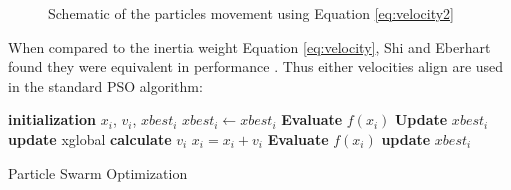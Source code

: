 \begin{figure}
    \centering
    
    \caption{Schematic of the particles movement using Equation \ref{eq:velocity2}}
    \label{fig:particle movement}
\end{figure}

When compared to the inertia weight Equation \ref{eq:velocity}, Shi and Eberhart found they were equivalent in performance \cite{}. 
Thus either velocities align are used in the standard PSO algorithm: 
\begin{algorithm}[H]
  \begin{algorithmic}[1]

        \State \textbf{initialization} $x_i$, $v_i$, $xbest_i$ 
        $xbest_i \gets xbest_i$
        \State \textbf{Evaluate} $f(x_i)$  
        \State \textbf{Update} $xbest_i$ 
    \EndFor
            \State \textbf{update} xglobal 
            \State \textbf{calculate} $v_i$ 
            \State $x_i = x_i + v_i$
            \State \textbf{Evaluate} $f(x_i)$
            \State \textbf{update} $xbest_i$
        \EndFor
    \EndWhile
  \end{algorithmic}
\caption{Particle Swarm Optimization}
\label{algorithmPSO}
\end{algorithm}

